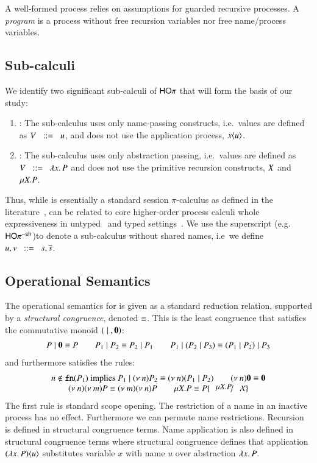 A well-formed process relies on assumptions for
guarded recursive processes.
A \emph{program} is a process without free 
recursion variables nor free name/process variables.



\subsection{Sub-calculi}

We identify two significant sub-calculi of $\mathsf{HO}\pi$ that will form 
the basis of our study:
%
\begin{enumerate}[-]
	\item	\sessp:
		The sub-calculus \sessp uses only name-passing constructs, i.e.~values
		are defined as $V \;\;::=\;\; u$, and does not use the application process,
		$x\langle u \rangle$.

	\item	\HO:
		The sub-calculus \HO uses only abstraction passing, i.e.~values
		are defined as $V \;\;::=\;\; \lambda x.\,P$ and does not use the primitive
		recursion constructs, $X$ and $\mu X. P$.
\end{enumerate}
%
Thus, while \sessp is essentially a standard session $\pi$-calculus as defined in the
literature~\cite{honda.vasconcelos.kubo:language-primitives,GH05},
\HO can be related to core higher-order process calculi whole expressiveness
in untyped~\cite{} and typed settings~\cite{}.
We use the superscript \minussh (e.g.~$\mathsf{HO}\pi^\mathsf{-sh}$)to denote a sub-calculus
without shared names, i.e~we define $u, v \;\;::=\;\; s, \overline{s}$.  

\subsection{Operational Semantics}
\label{subsec:reduction_semantics}

The operational semantics for \HOp is given as a standard reduction relation, supported by
a \emph{structural congruence}, denoted $\equiv$. This is 
the least congruence that satisfies the commutative monoid $(\;|\;, \mathbf{0})$:
%
\[
	\begin{array}{c}
		P \;|\; \mathbf{0} \equiv P
		\qquad
		P_1 \;|\; P_2 \equiv P_2 \;|\; P_1
		\qquad
		P_1 \;|\; (P_2 \;|\; P_3) \equiv (P_1 \;|\; P_2) \;|\; P_3
	\end{array}
\]
%
\noi and furthermore satisfies the rules:
%
\[
\begin{array}{c}
	n \notin \fn{P_1} \textrm{  implies  } P_1 \Par \news{n} P_2 \scong \news{n}(P_1 \Par P_2)
	\qquad
	\news{n} \inact \scong \inact
	\\
	\news{n} \news{m} P \scong \news{m} \news{n} P
	\qquad
	\recp{X}{P} \scong P\subst{\recp{X}{P}}{\rvar{X}}
\end{array}
\]
\noi The first rule is standard scope opening. The restriction
of a name in an inactive process has no effect. Furthermore
we can permute name restrictions. Recursion is defined
in structural congruence terms. Name application is also
defined in structural congruence terms where structural
congruence defines that application $(\lambda x.\,P)\langle u \rangle$ 
substitutes variable $x$ with name $u$ over abstraction $\lambda x.\,P$.

